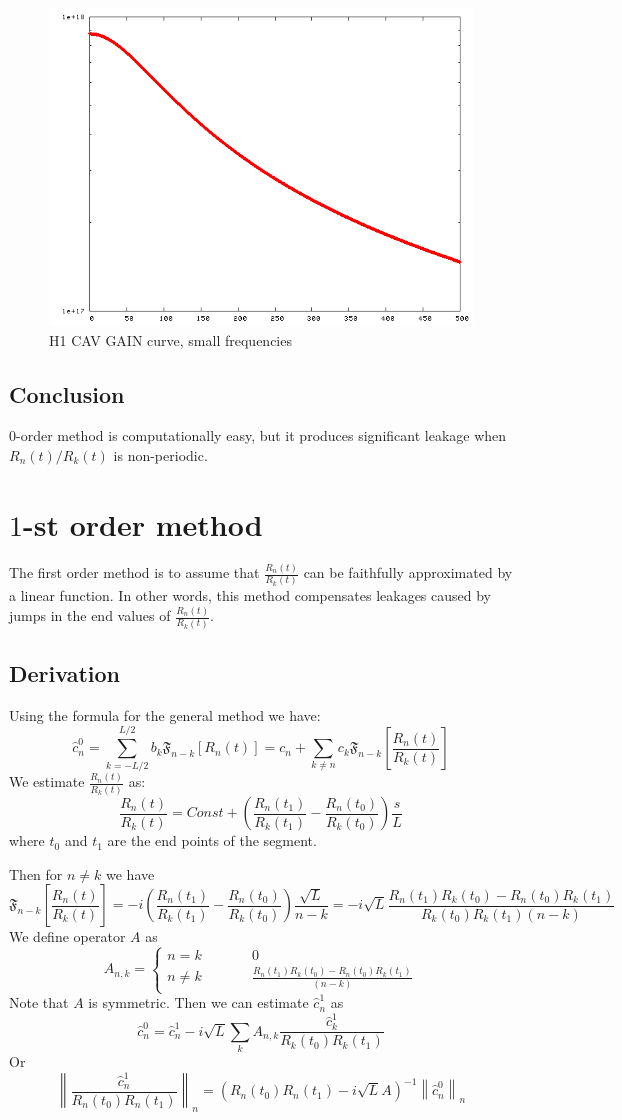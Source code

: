 \documentclass[12pt]{article}
\def\FTC#1#2{{\mathfrak F}_{#1}\left[#2\right]}
\begin{document}
\begin{figure}
\label{h1_cav_gain_2}
\centering
\includegraphics[scale=0.5]{S2/h1_cav_gain-3.png}
\caption{H1 CAV GAIN curve, small frequencies}
\end{figure}

\subsection{Conclusion}
$0$-order method is computationally easy, but it produces significant leakage
when $R_n(t)/R_k(t)$ is non-periodic.

\section{$1$-st order method}
The first order method is to assume that $\frac{R_n(t)}{R_k(t)}$ can be faithfully approximated
by a linear function. In other words, this method compensates leakages caused by jumps
in the end values of $\frac{R_n(t)}{R_k(t)}$.
\subsection{Derivation}
Using the formula for the general method we have:
$$
\hat{c}^0_n=\sum_{k=-L/2}^{L/2} b_k \FTC{n-k}{R_n(t)}=c_n+\sum_{k\neq n} c_k \FTC{n-k}{\frac{R_n(t)}{R_k(t)}}
$$
We estimate $\frac{R_n(t)}{R_k(t)}$ as:
$$
\frac{R_n(t)}{R_k(t)}=Const+\left(\frac{R_n(t_1)}{R_k(t_1)}-\frac{R_n(t_0)}{R_k(t_0)}\right)\frac{s}{L}
$$
where $t_0$ and $t_1$ are the end points of the segment.

Then for $n\neq k$ we have
$$
\FTC{n-k}{\frac{R_n(t)}{R_k(t)}}=-i\left(\frac{R_n(t_1)}{R_k(t_1)}-\frac{R_n(t_0)}{R_k(t_0)}\right)\frac{\sqrt{L}}{n-k}=
-i\sqrt{L}\frac{R_n(t_1)R_k(t_0)-R_n(t_0)R_k(t_1)}{R_k(t_0)R_k(t_1)(n-k)}
$$
We define operator $A$ as
$$
A_{n,k}=\left\{\begin{array}{lcl}
n=k & \qquad & 0 \\
n\neq k & \qquad & \frac{R_n(t_1)R_k(t_0)-R_n(t_0)R_k(t_1)}{(n-k)}
\end{array}
\right.
$$
Note that $A$ is symmetric.
Then we can estimate $\hat{c}^1_n$ as 
$$
\hat{c}^0_n=\hat{c}^1_n-i\sqrt{L}\sum_k A_{n,k}\frac{\hat{c}^1_k}{R_k(t_0)R_k(t_1)}
$$
Or
$$
\left\|\frac{\hat{c}^1_n}{R_n(t_0)R_n(t_1)}\right\|_n=\left(R_n(t_0)R_n(t_1)-i\sqrt{L} A\right)^{-1}\left\|\hat{c}^0_n\right\|_n
$$
\end{document}
